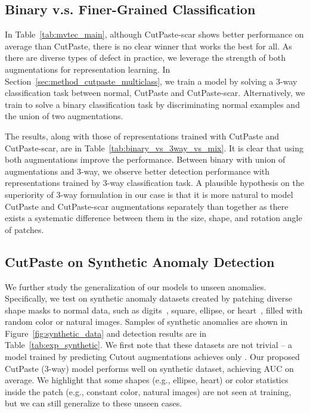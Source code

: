 \documentclass[final]{cvpr}
\begin{document}
\vspace{-0.05in}
\subsection{Binary v.s. Finer-Grained Classification}
\label{sec:abl_2way_vs_3way}
In Table~\ref{tab:mvtec_main}, although CutPaste-scar shows better performance on average than CutPaste, there is no clear winner that works the best for all. As there are diverse types of defect in practice, we leverage the strength of both augmentations for representation learning.
In Section~\ref{sec:method_cutpaste_multiclass}, we train a model by solving a 3-way classification task between normal, CutPaste and CutPaste-scar. Alternatively, we train to solve a binary classification task by discriminating normal examples and the union of
two augmentations.


The results, along with those of representations trained with CutPaste and CutPaste-scar, are in Table~\ref{tab:binary_vs_3way_vs_mix}. It is clear that using both augmentations improve the performance. Between binary with union of augmentations and 3-way, we observe better detection performance with representations trained by 3-way classification task.
A plausible hypothesis on the superiority of 3-way formulation in our case is that it is more natural to model CutPaste and CutPaste-scar augmentations separately than together as there exists a systematic difference between them in the size, shape, and rotation angle of patches.



\subsection{CutPaste on Synthetic Anomaly Detection}
\label{sec:abl_synthetic}

We further study the generalization of our models to unseen anomalies. Specifically, we test on synthetic anomaly datasets created by patching diverse shape masks to normal data, such as digits~\cite{lecun1998gradient}, square, ellipse, or heart~\cite{matthey2017dsprites}, filled with random color or natural images. Samples of synthetic anomalies are shown in Figure~\ref{fig:synthetic_data} and detection results are in Table~\ref{tab:exp_synthetic}.
We first note that these datasets are not trivial -- a model trained by predicting Cutout augmentations achieves only . Our proposed CutPaste (3-way) model performs well on synthetic dataset, achieving  AUC on average. 
We highlight that some shapes (e.g., ellipse, heart) or color statistics inside the patch (e.g., constant color, natural images) are not seen at training, but we can still generalize to these unseen cases.
\end{document}
